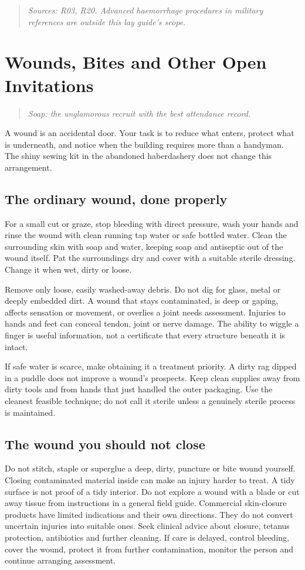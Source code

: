 \documentclass[10pt,openright]{book}
\begin{document}
\begin{quote}\emph{Sources: R03, R20. Advanced haemorrhage procedures in military references are outside this lay guide's scope.}\end{quote}

\chapter{Wounds, Bites and Other Open Invitations}
\begin{quote}\emph{Soap: the unglamorous recruit with the best attendance record.}\end{quote}
A wound is an accidental door. Your task is to reduce what enters, protect what is underneath, and notice when the building requires more than a handyman. The shiny sewing kit in the abandoned haberdashery does not change this arrangement.

\section*{The ordinary wound, done properly}
For a small cut or graze, stop bleeding with direct pressure, wash your hands and rinse the wound with clean running tap water or safe bottled water. Clean the surrounding skin with soap and water, keeping soap and antiseptic out of the wound itself. Pat the surroundings dry and cover with a suitable sterile dressing. Change it when wet, dirty or loose.

Remove only loose, easily washed-away debris. Do not dig for glass, metal or deeply embedded dirt. A wound that stays contaminated, is deep or gaping, affects sensation or movement, or overlies a joint needs assessment. Injuries to hands and feet can conceal tendon, joint or nerve damage. The ability to wiggle a finger is useful information, not a certificate that every structure beneath it is intact.

If safe water is scarce, make obtaining it a treatment priority. A dirty rag dipped in a puddle does not improve a wound's prospects. Keep clean supplies away from dirty tools and from hands that just handled the outer packaging. Use the cleanest feasible technique; do not call it sterile unless a genuinely sterile process is maintained.

\section*{The wound you should not close}
Do not stitch, staple or superglue a deep, dirty, puncture or bite wound yourself. Closing contaminated material inside can make an injury harder to treat. A tidy surface is not proof of a tidy interior. Do not explore a wound with a blade or cut away tissue from instructions in a general field guide. Commercial skin-closure products have limited indications and their own directions. They do not convert uncertain injuries into suitable ones. Seek clinical advice about closure, tetanus protection, antibiotics and further cleaning. If care is delayed, control bleeding, cover the wound, protect it from further contamination, monitor the person and continue arranging assessment.
\end{document}
